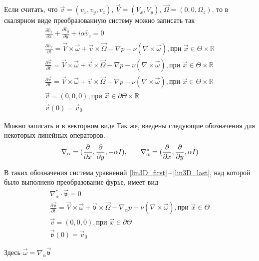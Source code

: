 Если считать, что $\vec v = (v_x, v_y, v_z)$, $\vec V = (V_x, V_y)$, $\vec \Omega = (0, 0, \Omega_z)$, то в скалярном виде преобразованную систему можно записать так
\begin{gather} 
  \label{scalar3D_first}
 \frac{\partial \hat v_x}{\partial x} + \frac{\partial \hat v_y}{\partial y} + i\alpha \hat v_z= 0\\
% 
 \frac{\partial \hat v_x}{\partial t} = \vec V \times \vec \omega + \vec v \times \vec \Omega - \nabla p - \nu ( \nabla \times \vec \omega ), \text{при } \vec x \in \Theta \times \mathbb{R}\\
% 
 \frac{\partial \vec v}{\partial t} = \vec V \times \vec \omega + \vec v \times \vec \Omega - \nabla p - \nu ( \nabla \times \vec \omega ), \text{при } \vec x \in \Theta \times \mathbb{R}\\
% 
 \frac{\partial \vec v}{\partial t} = \vec V \times \vec \omega + \vec v \times \vec \Omega - \nabla p - \nu ( \nabla \times \vec \omega ), \text{при } \vec x \in \Theta \times \mathbb{R}\\
% 
 \vec v = (0,0,0), \text{при } \vec x \in \partial \Theta \times \mathbb{R} \\
 \vec v (0) = \vec v _0 
  \label{scalar3D_last}
\end{gather}







Можно записать и в векторном виде
Так же, введены следующие обозначения для некоторых линейных операторов.
$$
  \nabla_\alpha = (\frac{\partial}{\partial x},\frac{\partial}{\partial y},-\alpha I)\text{,\qquad} 
  \nabla_\alpha^* = (\frac{\partial}{\partial x},\frac{\partial}{\partial y},\alpha I) 
$$

В таких обозначения система уравнений \ref{lin3D_first}\,--\,\ref{lin3D_last}, над которой было выполнено преобразование фурье, имеет вид
\begin{gather} 
  \label{ft3D_first}
  \nabla_\alpha^* \cdot  \mathfrak{\vec v} = 0\\
  \frac{\partial \mathfrak{\vec v}}{\partial t} = \vec V \times \mathfrak{\vec \omega} + \mathfrak{\vec v} \times \vec \Omega - \nabla_\alpha p - \nu ( \nabla \times \mathfrak{\vec \omega} ), \text{при } \vec x \in \Theta\\
  \vec v = (0,0,0), \text{при } \vec x \in \partial \Theta\\
  \mathfrak{\vec v} (0) = \vec v _0 \label{ft3D_last}
\end{gather}

Здесь $\mathfrak{\vec \omega} = \nabla_\alpha \mathfrak{\vec v}$ 
\newpage
